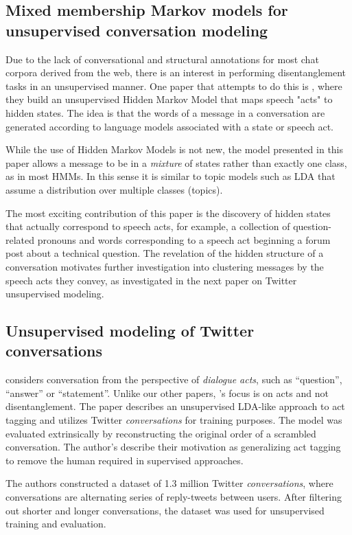 \documentclass{article}
\begin{document}
\subsection{Mixed membership Markov models for unsupervised conversation modeling}
Due to the lack of conversational and structural annotations for most chat corpora derived from the web, there is an interest in performing disentanglement tasks in an unsupervised manner. One paper that attempts to do this is \cite{Paul2012}, where they build an unsupervised Hidden Markov Model that maps speech "acts" to hidden states. The idea is that the words of a message in a conversation are generated according to language models associated with a state or speech act. 

While the use of Hidden Markov Models is not new, the model presented in this paper allows a message to be in a \emph{mixture} of states rather than exactly one class, as in most HMMs. In this sense it is similar to topic models such as LDA that assume a distribution over multiple classes (topics).

The most exciting contribution of this paper is the discovery of hidden states that actually correspond to speech acts, for example, a collection of question-related pronouns and words corresponding to a speech act beginning a forum post about a technical question. The revelation of the hidden structure of a conversation motivates further investigation into clustering messages by the speech acts they convey, as investigated in the next paper on Twitter unsupervised modeling.

\subsection{Unsupervised modeling of Twitter conversations}
\cite{Ritter2010a} considers conversation from the perspective of 
\textit{dialogue acts}, such as ``question'', ``answer'' or ``statement''. Unlike our other papers,
\cite{Ritter2010a}'s focus is on acts and not disentanglement. The paper describes
an unsupervised LDA-like approach to act tagging and utilizes Twitter \textit{conversations} for
training purposes. The model was evaluated extrinsically by reconstructing 
the original order of a scrambled conversation. The author's describe their motivation as
generalizing act tagging to remove the human required in supervised approaches. 

The authors constructed a dataset of 1.3 million Twitter \textit{conversations}, 
where conversations are alternating series of reply-tweets between users. After filtering out shorter 
and longer conversations, the dataset was used for unsupervised training and evaluation.
\end{document}
